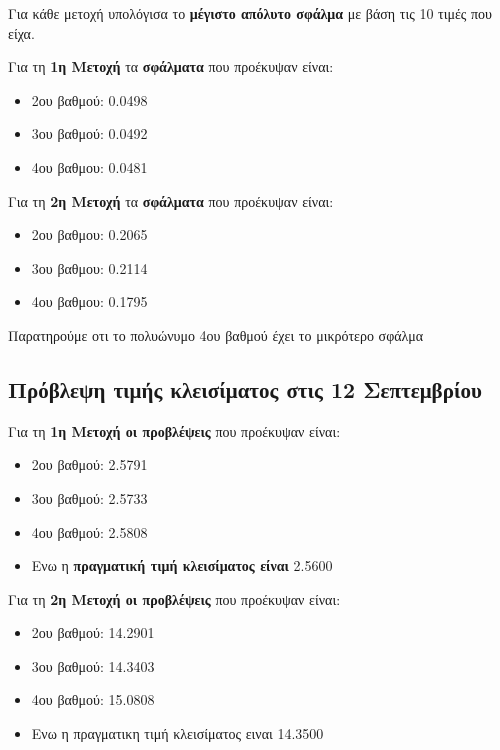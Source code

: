 \documentclass[18pt]{article}
\begin{document}
Για κάθε μετοχή υπολόγισα το \textbf{μέγιστο απόλυτο σφάλμα} με βάση τις 10 τιμές που είχα.

\vspace{0.5cm}

Για τη \textbf{1η Μετοχή} τα \textbf{σφάλματα} που προέκυψαν είναι:

\begin{itemize}
\item 2ου βαθμού: 0.0498
\item 3ου βαθμού: 0.0492  
\item 4ου βαθμου: 0.0481
\end{itemize}

\vspace{0.2cm}

Για τη \textbf{2η Μετοχή} τα \textbf{σφάλματα} που προέκυψαν είναι:

\begin{itemize}
\item 2ου βαθμου:  0.2065
\item 3ου βαθμου:  0.2114
\item 4ου βαθμου:  0.1795
\end{itemize}

\vspace{0.2cm}
Παρατηρούμε οτι το πολυώνυμο 4ου βαθμού έχει το μικρότερο σφάλμα
\vspace{0.5cm}

\newpage
\subsection*{Πρόβλεψη τιμής κλεισίματος στις 12 Σεπτεμβρίου}

\vspace{0.2cm}

Για τη \textbf{1η Μετοχή οι προβλέψεις} που προέκυψαν είναι:

\begin{itemize}
    \item 2ου βαθμού: 2.5791
    \item 3ου βαθμού: 2.5733
    \item 4ου βαθμού: 2.5808
    \item Ενω η \textbf{πραγματική τιμή κλεισίματος είναι} 2.5600
\end{itemize}

\vspace{0.5cm}

Για τη \textbf{2η Μετοχή οι προβλέψεις} που προέκυψαν είναι:
\begin{itemize}
    \item 2ου βαθμού: 14.2901
    \item 3ου βαθμού: 14.3403
    \item 4ου βαθμού: 15.0808
    \item Ενω η πραγματικη τιμή κλεισίματος ειναι 14.3500
\end{itemize}
\end{document}
